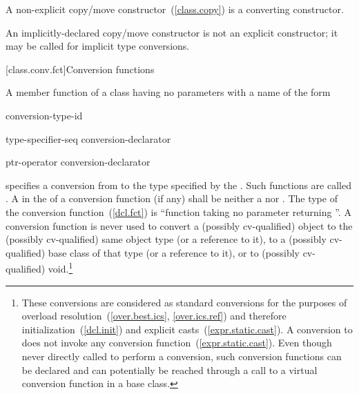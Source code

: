 \pnum
A
non-explicit
copy/move constructor~(\ref{class.copy}) is a converting constructor.
\begin{note}
An implicitly-declared copy/move constructor is not an explicit constructor;
it may be called for implicit type conversions.
\end{note}

[class.conv.fct]{Conversion functions}%
%
%
%

\pnum
A member function of a class  having no parameters with a name of the form

\begin{bnf}
\br
     conversion-type-id
\end{bnf}

\begin{bnf}
\br
    type-specifier-seq conversion-declarator\opt
\end{bnf}

\begin{bnf}
\br
    ptr-operator conversion-declarator\opt
\end{bnf}

specifies a conversion from
to the type specified by the
.
Such functions are called .
A  in the 
of a conversion function (if any) shall be neither
a  nor .
%
The type of the conversion function~(\ref{dcl.fct}) is
``function taking no parameter returning
''.
A conversion function is never used to convert a (possibly cv-qualified) object
to the (possibly cv-qualified) same object type (or a reference to it),
to a (possibly cv-qualified) base class of that type (or a reference to it),
or to (possibly cv-qualified) void.\footnote{These conversions are considered
as standard conversions for the purposes of overload resolution~(\ref{over.best.ics}, \ref{over.ics.ref}) and therefore initialization~(\ref{dcl.init}) and explicit casts~(\ref{expr.static.cast}). A conversion to  does not invoke any conversion function~(\ref{expr.static.cast}).
Even though never directly called to perform a conversion,
such conversion functions can be declared and can potentially
be reached through a call to a virtual conversion function in a base class.}


